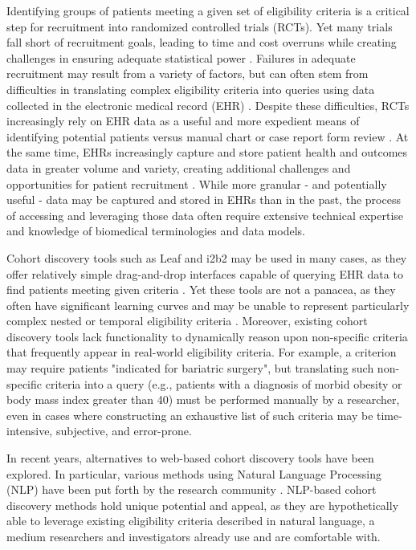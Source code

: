 \documentclass[../main.tex]{subfiles}
\begin{document}
Identifying groups of patients meeting a given set of eligibility criteria is a critical step for recruitment into randomized controlled trials (RCTs). Yet many trials fall short of recruitment goals, leading to time and cost overruns while creating challenges in ensuring adequate statistical power \cite{gul2010clinical, adams2015barriers}. Failures in adequate recruitment may result from a variety of factors, but can often stem from difficulties in translating complex eligibility criteria into queries using data collected in the electronic medical record (EHR) \cite{wang2017classifying}. Despite these difficulties, RCTs increasingly rely on EHR data as a useful and more expedient means of identifying potential patients versus manual chart or case report form review \cite{cowie2017electronic}. At the same time, EHRs increasingly capture and store patient health and outcomes data in greater volume and variety, creating additional challenges and opportunities for patient recruitment \cite{lee2017medical}. While more granular - and potentially useful - data may be captured and stored in EHRs than in the past, the process of accessing and leveraging those data often require extensive technical expertise and knowledge of biomedical terminologies and data models. 

Cohort discovery tools such as Leaf \cite{dobbins2019leaf} and i2b2 \cite{murphy2010serving} may be used in many cases, as they offer relatively simple drag-and-drop interfaces capable of querying EHR data to find patients meeting given criteria \cite{johnson2014use}. Yet these tools are not a panacea, as they often have significant learning curves and may be unable to represent particularly complex nested or temporal eligibility criteria \cite{deshmukh2009evaluating}. Moreover, existing cohort discovery tools lack functionality to dynamically reason upon non-specific criteria that frequently appear in real-world eligibility criteria. For example, a criterion may require patients "indicated for bariatric surgery", but translating such non-specific criteria into a query (e.g., patients with a diagnosis of morbid obesity or body mass index greater than 40) must be performed manually by a researcher, even in cases where constructing an exhaustive list of such criteria may be time-intensive, subjective, and error-prone. 

In recent years, alternatives to web-based cohort discovery tools have been explored. In particular, various methods using Natural Language Processing (NLP) have been put forth by the research community \cite{yuan2019criteria2query, soni2020patient, fang2022combining, zhang2020deepenroll, chen2019clinical, patrao2015recruit, dhayne2021emr2vec, liu2021evaluating, xiong2019cohort}. NLP-based cohort discovery methods hold unique potential and appeal, as they are hypothetically able to leverage existing eligibility criteria described in natural language, a medium researchers and investigators already use and are comfortable with.
\end{document}
